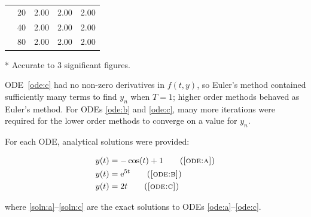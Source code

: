 \documentclass[a4paper,12pt,twocolumn]{article}
\begin{document}
\begin{table}[h]
\begin{threeparttable}
\begin{tabular}{
            @{}
            l
            S[table-format=2]
            S[table-format=1.2]
            S[table-format=1.2]
            S[table-format=1.2]
            @{}
        }
            & 20 & 2.00 & 2.00 & 2.00 \\
            & 40 & 2.00 & 2.00 & 2.00 \\
            & 80 & 2.00 & 2.00 & 2.00 \\
            \bottomrule
        \end{tabular}
        \begin{tablenotes}
            \item[*] Accurate to 3 significant figures.
        \end{tablenotes}
    \end{threeparttable}
    \vspace{-\baselineskip}
\end{table}

\vspace{-\baselineskip}
ODE~\eqref{ode:c} had no non-zero derivatives in $f(t,y)$, so Euler's method
contained sufficiently many terms to find $y_n$ when $T=1$; higher order
methods behaved as Euler's method. For ODEs \eqref{ode:b} and \eqref{ode:c},
many more iterations were required for the lower order methods to converge on a
value for $y_n$.

For each ODE, analytical solutions were provided:
\begin{footnotesize}
    \vspace{-0.5\baselineskip}
    \begin{align}
        y(t) &= -\cos(t) + 1    \tag{\sc\ref{ode:a}}\label{soln:a} \\ 
        y(t) &= \mathrm{e}^{5t} \tag{\sc\ref{ode:b}}\label{soln:b} \\
        y(t) &= 2t              \tag{\sc\ref{ode:c}}\label{soln:c}
    \end{align}
    \vspace{-1.5\baselineskip}
\end{footnotesize}

\hspace{-\parindent}where \eqref{soln:a}--\eqref{soln:c} are the exact solutions
to ODEs \eqref{ode:a}--\eqref{ode:c}.
\end{document}
